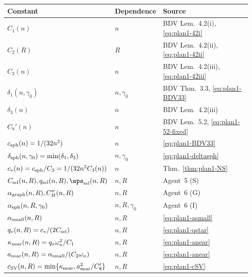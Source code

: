 \renewcommand{\arraystretch}{1.15}
\begin{center}
\begin{tabular}{|l|l|l|}
\hline
Constant & Dependence & Source \\
\hline
$C_{1}(n)$ & $n$ & BDV Lem.\ 4.2(i), \eqref{eq:plan1-42i}\\
$C_{2}(R)$ & $R$ & BDV Lem.\ 4.2(ii), \eqref{eq:plan1-42ii}\\
$C_{3}(n)$ & $n$ & BDV Lem.\ 4.2(iii), \eqref{eq:plan1-42iii}\\
$\delta_{1}(n,\gamma_{0})$ & $n,\gamma_{0}$ & BDV Thm.\ 3.3, \eqref{eq:plan1-BDV33}\\
$\delta_{3}(n)$ & $n$ & BDV Lem.\ 4.2(iii)\\
$C_{8}'(n)$ & $n$ & BDV Lem.\ 5.2, \eqref{eq:plan1-52-fixed}\\
$c_{\rm sph}(n)=1/(32n^{2})$ & $n$ & \eqref{eq:plan1-BDV33}\\
$\delta_{\rm sph}(n,\gamma_{0})=\min(\delta_{1},\delta_{3})$ & $n,\gamma_{0}$ & \eqref{eq:plan1-deltasph}\\
$c_{*}(n)=c_{\rm sph}/C_{3}=1/(32n^{2}C_{3}(n))$ & $n$ & Thm.\ \ref{thm:plan1-NS}\\
$C_{\rm sel}(n,R), q_{\rm sel}(n,R), \eps_{\rm sel}(n,R)$ & $n,R$ & Agent~5 (S)\\
$\alpha_{\rm graph}(n,R), C_{H}''(n,R)$ & $n,R$ & Agent~6 (G)\\
$\alpha_{\rm sph}(n,R,\gamma_{0})$ & $n,R,\gamma_{0}$ & Agent~6 (I)\\
\hline
$\alpha_{\rm small}(n,R)$ & $n,R$ & \eqref{eq:plan1-asmall}\\
$q_{*}(n,R)=c_{*}/(2C_{\rm sel})$ & $n,R$ & \eqref{eq:plan1-qstar}\\
$\kappa_{\rm near}(n,R)=q_{*}\omega_{n}^{2}/C_{1}$ & $n,R$ & \eqref{eq:plan1-anear}\\
$a_{\rm near}(n,R)=\alpha_{\rm small}/(C_{2}\omega_{n})$ & $n,R$ & \eqref{eq:plan1-anear}\\
$c_{\rm SV}(n,R)=\min\{\kappa_{\rm near},a_{\rm near}^{2}/C_{8}'\}$ & $n,R$ & \eqref{eq:plan1-cSV}\\
\hline
\end{tabular}
\end{center}

